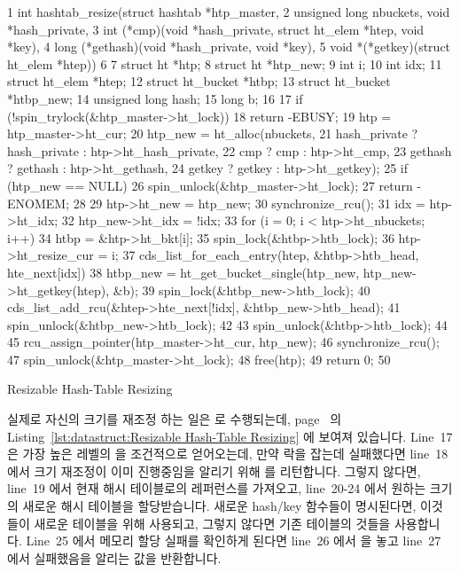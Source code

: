\begin{listing*}[tb]
{ \scriptsize
\begin{verbbox}
 1 int hashtab_resize(struct hashtab *htp_master,
 2                    unsigned long nbuckets, void *hash_private,
 3                    int (*cmp)(void *hash_private, struct ht_elem *htep, void *key),
 4                    long (*gethash)(void *hash_private, void *key),
 5                    void *(*getkey)(struct ht_elem *htep))
 6 {
 7   struct ht *htp;
 8   struct ht *htp_new;
 9   int i;
10   int idx;
11   struct ht_elem *htep;
12   struct ht_bucket *htbp;
13   struct ht_bucket *htbp_new;
14   unsigned long hash;
15   long b;
16 
17   if (!spin_trylock(&htp_master->ht_lock))
18     return -EBUSY;
19   htp = htp_master->ht_cur;
20   htp_new = ht_alloc(nbuckets,
21                      hash_private ? hash_private : htp->ht_hash_private,
22                      cmp ? cmp : htp->ht_cmp,
23                      gethash ? gethash : htp->ht_gethash,
24                      getkey ? getkey : htp->ht_getkey);
25   if (htp_new == NULL) {
26     spin_unlock(&htp_master->ht_lock);
27     return -ENOMEM;
28   }
29   htp->ht_new = htp_new;
30   synchronize_rcu();
31   idx = htp->ht_idx;
32   htp_new->ht_idx = !idx;
33   for (i = 0; i < htp->ht_nbuckets; i++) {
34     htbp = &htp->ht_bkt[i];
35     spin_lock(&htbp->htb_lock);
36     htp->ht_resize_cur = i;
37     cds_list_for_each_entry(htep, &htbp->htb_head, hte_next[idx]) {
38       htbp_new = ht_get_bucket_single(htp_new, htp_new->ht_getkey(htep), &b);
39       spin_lock(&htbp_new->htb_lock);
40       cds_list_add_rcu(&htep->hte_next[!idx], &htbp_new->htb_head);
41       spin_unlock(&htbp_new->htb_lock);
42     }
43     spin_unlock(&htbp->htb_lock);
44   }
45   rcu_assign_pointer(htp_master->ht_cur, htp_new);
46   synchronize_rcu();
47   spin_unlock(&htp_master->ht_lock);
48   free(htp);
49   return 0;
50 }
\end{verbbox}
}
\centering
\theverbbox
\caption{Resizable Hash-Table Resizing}
\label{lst:datastruct:Resizable Hash-Table Resizing}
\end{listing*}

실제로 자신의 크기를 재조정 하는 일은  로 수행되는데,
page~\pageref{lst:datastruct:Resizable Hash-Table Resizing} 의
Listing~\ref{lst:datastruct:Resizable Hash-Table Resizing} 에 보여져 있습니다.
Line~17 은 가장 높은 레벨의  을 조건적으로 얻어오는데, 만약 락을
잡는데 실패했다면 line~18 에서 크기 재조정이 이미 진행중임을 알리기 위해
 를 리턴합니다.
그렇지 않다면, line~19 에서 현재 해시 테이블로의 레퍼런스를 가져오고,
line~20-24 에서 원하는 크기의 새로운 해시 테이블을 할당받습니다.
새로운 hash/key 함수들이 명시된다면, 이것들이 새로운 테이블을 위해 사용되고,
그렇지 않다면 기존 테이블의 것들을 사용합니다.
Line~25 에서 메모리 할당 실패를 확인하게 된다면 line~26 에서  을
놓고 line~27 에서 실패했음을 알리는 값을 반환합니다.
\iffalse

